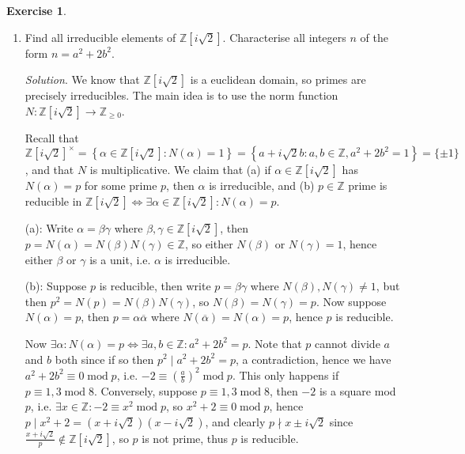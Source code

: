 \documentclass{article}
\newcommand{\Z}{\mathbb{Z}}
\newcommand{\Mod}{\operatorname{mod}}
\theoremstyle{definition}
\newtheorem{exe}[defn]{Exercise}
\begin{document}
\begin{exe}
\begin{enumerate}
\item Find all irreducible elements of $\Z\left[i\sqrt 2\right]$. Characterise all integers $n$ of the form $n=a^2+2b^2$.

\textit{Solution}. We know that $\Z\left[i\sqrt 2\right]$ is a euclidean domain, so primes are precisely irreducibles. The main idea is to use the norm function $N:\Z\left[i\sqrt 2\right]\rightarrow\Z_{\geq 0}$.

Recall that $\Z\left[i\sqrt 2\right]^\times=\left\{\alpha\in\Z\left[i\sqrt 2\right]:N(\alpha)=1\right\}=\left\{a+i\sqrt 2 b:a,b\in\Z,a^2+2b^2=1\right\}=\{\pm 1\}$, and that $N$ is multiplicative. We claim that (a) if $\alpha\in\Z\left[i\sqrt 2\right]$ has $N(\alpha)=p$ for some prime $p$, then $\alpha$ is irreducible, and (b) $p\in\Z$ prime is reducible in $\Z\left[i\sqrt 2\right]\iff\exists\alpha\in\Z\left[i\sqrt 2\right]:N(\alpha)=p$.

(a): Write $\alpha=\beta\gamma$ where $\beta,\gamma\in\Z\left[i\sqrt 2\right]$, then $p=N(\alpha)=N(\beta)N(\gamma)\in\Z$, so either $N(\beta)$ or $N(\gamma)=1$, hence either $\beta$ or $\gamma$ is a unit, i.e. $\alpha$ is irreducible.

(b): Suppose $p$ is reducible, then write $p=\beta\gamma$ where $N(\beta),N(\gamma)\neq 1$, but then $p^2=N(p)=N(\beta)N(\gamma)$, so $N(\beta)=N(\gamma)=p$. Now suppose $N(\alpha)=p$, then $p=\alpha\overline{\alpha}$ where $N(\overline\alpha)=N(\alpha)=p$, hence $p$ is reducible.

Now $\exists\alpha:N(\alpha)=p\iff\exists a,b\in\Z:a^2+2b^2=p$. Note that $p$ cannot divide $a$ and $b$ both since if so then $p^2\mid a^2+2b^2=p$, a contradiction, hence we have $a^2+2b^2\equiv 0\Mod p$, i.e. $-2\equiv \left(\frac{a}{b}\right)^2\Mod p$. This only happens if $p\equiv 1,3\Mod 8$. Conversely, suppose $p\equiv 1,3\Mod 8$, then $-2$ is a square mod $p$, i.e. $\exists x\in\Z:-2\equiv x^2\Mod p$, so $x^2+2\equiv 0\Mod p$, hence $p\mid x^2+2=\left(x+i\sqrt 2\right)\left(x-i\sqrt 2\right)$, and clearly $p\nmid x\pm i\sqrt 2$ since $\frac{x+i\sqrt 2}{p}\notin\Z\left[i\sqrt 2\right]$, so $p$ is not prime, thus $p$ is reducible.


\end{enumerate}
\end{exe}
\end{document}
